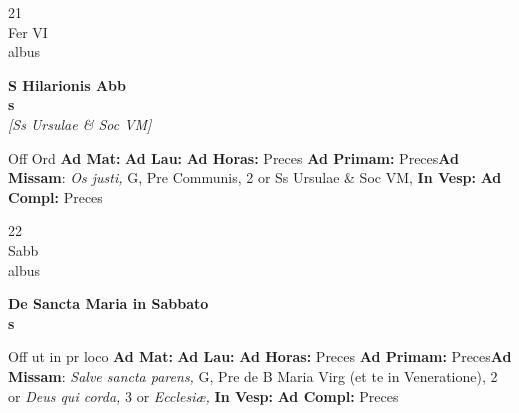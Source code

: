 \documentclass[10pt, openany]{book}
\begin{document}
    \begin{center}
        \begin{minipage}{3.5in}
            \vspace{2em}
            \begin{minipage}{0.5in}
                {\Huge 21} \\
                {\normalsize Fer VI} \\
                {\normalsize albus}
            \end{minipage}
            \begin{minipage}{3.0in}
                \textbf{ \large S Hilarionis Abb \\
                \textnormal{\normalsize s}} \\ \textit{[Ss Ursulae \& Soc VM]} \\ 
            \end{minipage}
            \begin{justify}Off Ord
                \textbf{Ad Mat: }
                \textbf{Ad Lau: }
                \textbf{Ad Horas: }Preces
                \textbf{Ad Primam: }Preces\textbf{Ad Missam}: \textit{Os justi,} G, Pre Communis, 2 or Ss Ursulae \& Soc VM,  
                \textbf{In Vesp: }
                \textbf{Ad Compl: }Preces
            \end{justify}
        \end{minipage}
    \end{center}

    \begin{center}
        \begin{minipage}{3.5in}
            \vspace{2em}
            \begin{minipage}{0.5in}
                {\Huge 22} \\
                {\normalsize Sabb} \\
                {\normalsize albus}
            \end{minipage}
            \begin{minipage}{3.0in}
                \textbf{ \large De Sancta Maria in Sabbato \\
                \textnormal{\normalsize s}} \\ 
            \end{minipage}
            \begin{justify}Off ut in pr loco
                \textbf{Ad Mat: }
                \textbf{Ad Lau: }
                \textbf{Ad Horas: }Preces
                \textbf{Ad Primam: }Preces\textbf{Ad Missam}: \textit{Salve sancta parens,} G, Pre de B Maria Virg (et te in Veneratione), 2 or \textit{Deus qui corda,} 3 or \textit{Ecclesiæ,}  
                \textbf{In Vesp: }
                \textbf{Ad Compl: }Preces
            \end{justify}
        \end{minipage}
    \end{center}
\end{document}
